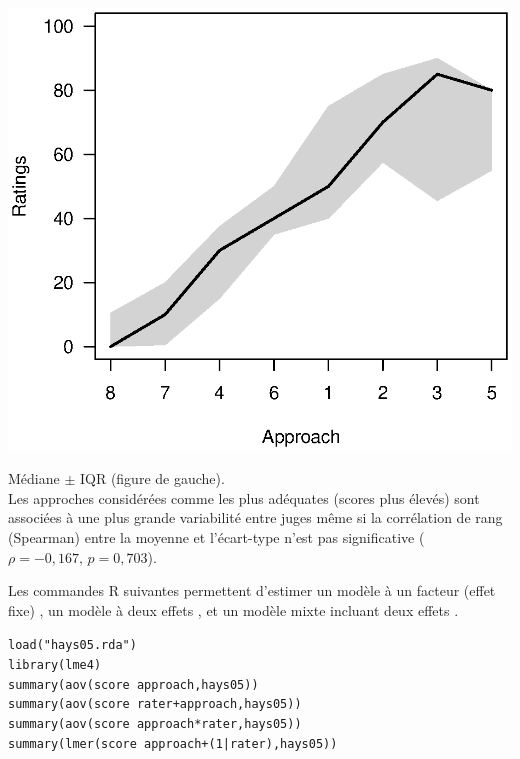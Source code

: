 \foilhead{}
\begin{minipage}{0.45\textwidth}
\centerline{\includegraphics[scale=.85]{./figs/hays05.eps}}
\end{minipage}\hfill
\begin{minipage}{0.5\textwidth}
\small
Médiane $\pm$ IQR (figure de gauche).\\
Les approches considérées comme les plus adéquates (scores plus élevés) sont
associées à une plus grande variabilité entre juges même si la corrélation de
rang (Spearman) entre la moyenne et l'écart-type n'est pas significative
($\rho=-0,167,\, p=0,703$). 
\end{minipage}


Les commandes R suivantes permettent d'estimer un modèle à un facteur (effet
fixe) , un modèle à deux effets , et un modèle mixte
incluant deux effets . 

\begin{alltt}
load("hays05.rda")
library(lme4)
summary(aov(score ~ approach, hays05)) \hfill{}
summary(aov(score ~ rater+approach, hays05)) \hfill{}
summary(aov(score ~ approach*rater, hays05)) \hfill{}
summary(lmer(score ~ approach + (1 | rater), hays05)) \hfill{}
\end{alltt}

